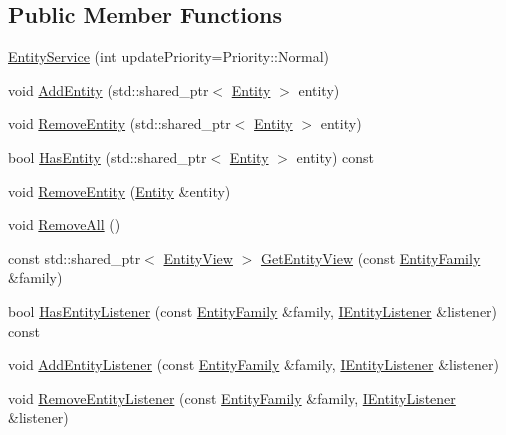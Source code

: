 \subsection*{Public Member Functions}
\begin{DoxyCompactItemize}
\item 
\hyperlink{classastu_1_1EntityService_a74fc8d1e8b7aadf0899142c248cb2211}{Entity\+Service} (int update\+Priority=Priority\+::\+Normal)
\item 
void \hyperlink{classastu_1_1EntityService_ad6c6cb81dc8c48c7688f438571ee5da8}{Add\+Entity} (std\+::shared\+\_\+ptr$<$ \hyperlink{classastu_1_1Entity}{Entity} $>$ entity)
\item 
void \hyperlink{classastu_1_1EntityService_a748a71e470d5bb51bb650b15e0a78c63}{Remove\+Entity} (std\+::shared\+\_\+ptr$<$ \hyperlink{classastu_1_1Entity}{Entity} $>$ entity)
\item 
bool \hyperlink{classastu_1_1EntityService_a4a3c14fd7aa8edf4263913046744f277}{Has\+Entity} (std\+::shared\+\_\+ptr$<$ \hyperlink{classastu_1_1Entity}{Entity} $>$ entity) const
\item 
void \hyperlink{classastu_1_1EntityService_ac543fe51a3d1c9784bcab5775f5d388d}{Remove\+Entity} (\hyperlink{classastu_1_1Entity}{Entity} \&entity)
\item 
void \hyperlink{classastu_1_1EntityService_a1b21cf207324748c13c34568d3c1513e}{Remove\+All} ()
\item 
const std\+::shared\+\_\+ptr$<$ \hyperlink{group__ecs__group_gace2fb790b86c3908a65e4222f7ac2f4e}{Entity\+View} $>$ \hyperlink{classastu_1_1EntityService_aa295c07eb6a5c5321cf5820c9e41d008}{Get\+Entity\+View} (const \hyperlink{classastu_1_1EntityFamily}{Entity\+Family} \&family)
\item 
bool \hyperlink{classastu_1_1EntityService_a57fa7f62f90b8ecf4513045d7be9f15c}{Has\+Entity\+Listener} (const \hyperlink{classastu_1_1EntityFamily}{Entity\+Family} \&family, \hyperlink{classastu_1_1IEntityListener}{I\+Entity\+Listener} \&listener) const
\item 
void \hyperlink{classastu_1_1EntityService_ab338b1904b61dfe71c2b3bbcb390ada1}{Add\+Entity\+Listener} (const \hyperlink{classastu_1_1EntityFamily}{Entity\+Family} \&family, \hyperlink{classastu_1_1IEntityListener}{I\+Entity\+Listener} \&listener)
\item 
void \hyperlink{classastu_1_1EntityService_af9b12ecd243f0b0f98799fa2d147fecb}{Remove\+Entity\+Listener} (const \hyperlink{classastu_1_1EntityFamily}{Entity\+Family} \&family, \hyperlink{classastu_1_1IEntityListener}{I\+Entity\+Listener} \&listener)
\end{DoxyCompactItemize}
